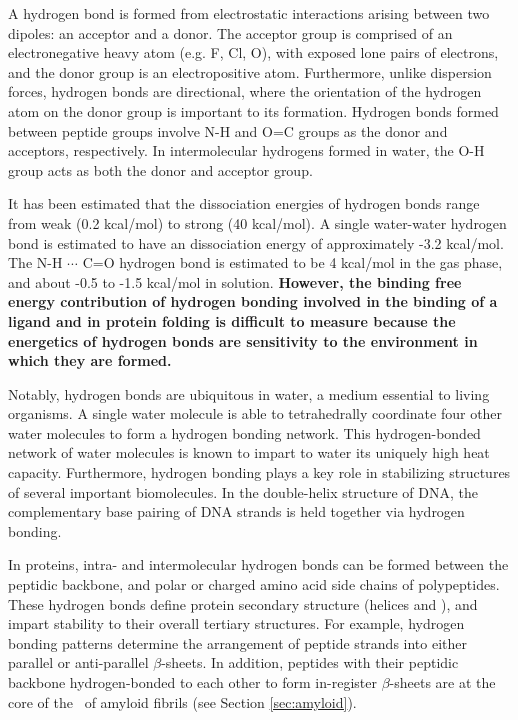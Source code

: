 A hydrogen bond is formed from electrostatic interactions arising between two dipoles: an acceptor and a donor.   The acceptor group is comprised of an electronegative heavy atom (e.g. F, Cl, O), with exposed lone pairs of electrons, and the donor group is an electropositive atom.  Furthermore, unlike dispersion forces, hydrogen bonds are directional, where the orientation of the hydrogen atom on the donor group is important to its formation. Hydrogen bonds formed between peptide groups involve N-H and O=C groups as the donor and acceptors, respectively.  In intermolecular hydrogens formed in water, the O-H group acts as both the donor and acceptor group.

It has been estimated that the dissociation energies of hydrogen bonds range from weak (0.2 kcal/mol) to strong (40 kcal/mol).\cite{Steiner:2002tb} A single water-water hydrogen bond is estimated to have an dissociation energy of approximately -3.2 kcal/mol.\cite{Steiner:2002tb}  The N-H $\cdots$ C=O hydrogen bond is estimated to be 4 kcal/mol in the gas phase,\cite{Klotz:1993fk} and about -0.5 to -1.5 kcal/mol in solution.\cite{Williams:1993wk} %
\textbf{However, the binding free energy contribution of hydrogen bonding involved in the binding of a ligand and in protein folding is difficult to measure because the energetics of hydrogen bonds are sensitivity to the environment in which they are formed.}\cite{Klotz:1993fk}

Notably, hydrogen bonds are ubiquitous in water, a medium essential to living organisms. A single water molecule is able to tetrahedrally coordinate four other water molecules to form a hydrogen bonding network. This hydrogen-bonded network of water molecules is known to impart to water its uniquely high heat capacity.  Furthermore, hydrogen bonding plays a key role in stabilizing structures of several important biomolecules.  In the double-helix structure of DNA,  the complementary base pairing of DNA strands is held together via hydrogen bonding.

In proteins, intra- and intermolecular hydrogen bonds can be formed between the peptidic backbone, and polar or charged amino acid side chains of polypeptides.  These hydrogen bonds define protein secondary structure (helices and \bsheets), and impart stability to their overall tertiary structures. For example, hydrogen bonding patterns determine the arrangement of peptide strands into either parallel or anti-parallel $\beta$-sheets. In addition, peptides with their peptidic backbone hydrogen-bonded to each other to form in-register $\beta$-sheets are at the core of the \crossbs\ of amyloid fibrils (see Section \ref{sec:amyloid}). 

